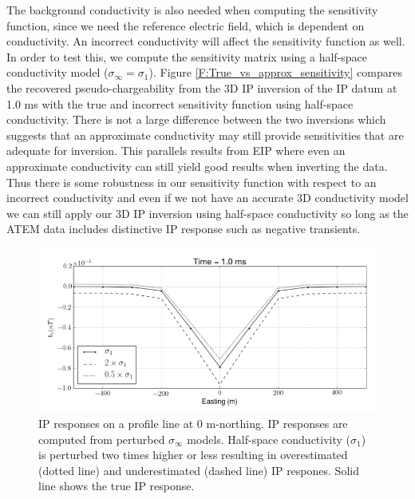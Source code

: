 \documentclass[a4paper, 11pt]{article}
\newcommand{\siginf}{\sigma_\infty}
\newcommand{\dip}{d^{IP}}
\begin{document}
The background conductivity is also needed when computing the sensitivity function, since we need the reference electric field, which is dependent on conductivity. 
An incorrect conductivity will affect the sensitivity function as well. 
In order to test this, we compute the sensitivity  matrix using a half-space conductivity model ($\siginf = \sigma_1$). 
Figure \ref{F:True_vs_approx_sensitivity} compares the recovered pseudo-chargeability from the 3D IP inversion of the IP datum at 1.0 ms with the true and incorrect sensitivity function using half-space conductivity. 
There is not a large difference between the two inversions  which suggests that an approximate conductivity may still provide sensitivities that are adequate for inversion. This parallels results from EIP where even an approximate conductivity can still yield good results when inverting the data. Thus there is some robustness in our sensitivity function with respect to an  incorrect conductivity and even if we  not have an accurate 3D conductivity model we can still apply our 3D IP inversion using half-space conductivity so long as the ATEM data includes distinctive IP response such as negative transients.


\begin{figure}[htb]
  \centering
  \includegraphics[width=1.\textwidth]{figures/Reg_IPresp.png}
  \caption{IP responses on a profile line at 0 m-northing.  IP responses are computed from perturbed $\siginf$ models. Half-space conductivity ($\sigma_1$) is perturbed two times higher or less resulting in overestimated (dotted line) and underestimated (dashed line) IP respones. Solid line shows the true IP response. }
  \label{F:Reg_IPresp}
\end{figure}
\end{document}

